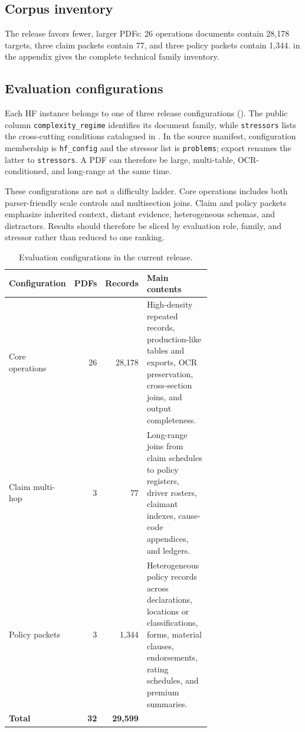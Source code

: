 \subsection{Corpus inventory}
The release favors fewer, larger PDFs: 26 operations documents contain 28{,}178 targets, three claim packets contain 77, and three policy packets contain 1{,}344.  in the appendix gives the complete technical family inventory.

\subsection{Evaluation configurations}
Each HF instance belongs to one of three release configurations (). The public column \texttt{complexity\_regime} identifies its document family, while \texttt{stressors} lists the cross-cutting conditions catalogued in . In the source manifest, configuration membership is \texttt{hf\_config} and the stressor list is \texttt{problems}; export renames the latter to \texttt{stressors}. A PDF can therefore be large, multi-table, OCR-conditioned, and long-range at the same time.

These configurations are not a difficulty ladder. Core operations includes both parser-friendly scale controls and multisection joins. Claim and policy packets emphasize inherited context, distant evidence, heterogeneous schemas, and distractors. Results should therefore be sliced by evaluation role, family, and stressor rather than reduced to one ranking.

\begin{table}[H]
\centering
\small
\caption{Evaluation configurations in the current release.}
\label{tab:evaluation-configurations}
\begin{tabular}{@{}p{0.26\linewidth}rr>{\raggedright\arraybackslash}p{0.42\linewidth}@{}}
\toprule
Configuration & PDFs & Records & Main contents \\
\midrule
Core operations & 26 & 28{,}178 & High-density repeated records, production-like tables and exports, OCR preservation, cross-section joins, and output completeness. \\
Claim multi-hop & 3 & 77 & Long-range joins from claim schedules to policy registers, driver rosters, claimant indexes, cause-code appendices, and ledgers. \\
Policy packets & 3 & 1{,}344 & Heterogeneous policy records across declarations, locations or classifications, forms, material clauses, endorsements, rating schedules, and premium summaries. \\
\midrule
\textbf{Total} & \textbf{32} & \textbf{29{,}599} & \\
\bottomrule
\end{tabular}
\end{table}

